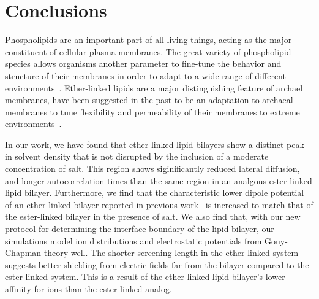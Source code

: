 \documentclass[12pt,openany,final]{book}
\begin{document}
\chapter{Conclusions}
Phospholipids are an important part of all living things, acting as the major constituent of cellular plasma membranes. 
The great variety of phospholipid species allows organisms another parameter
to fine-tune the behavior and structure of their membranes in order to adapt to a wide range of different
environments~\cite{van:2008:lipidvariety}.
Ether-linked lipids are a major distinguishing feature of archael membranes, have been suggested in the past to be an adaptation to archaeal membranes to tune
flexibility and permeability of their membranes to extreme environments~\cite{koga:2014,valentine:2007}.

In our work, we have found that ether-linked lipid bilayers show a distinct peak in solvent density
that is not disrupted by the inclusion of a moderate concentration of salt. This region
shows siginificantly reduced lateral diffusion, and longer autocorrelation times than the same
region in an analgous ester-linked lipid bilayer. Furthermore, we find that
the characteristic lower dipole potential of an ether-linked bilayer reported in previous work~\cite{kruczek:2017:ether} is 
increased to match that of the ester-linked bilayer in the presence of salt. We also find that,
with our new protocol for determining the interface boundary of the lipid bilayer,
our simulations model ion distributions and electrostatic potentials from Gouy-Chapman theory well. 
The shorter screening length in the
ether-linked system suggests better shielding from electric fields far 
from the bilayer compared to the ester-linked system. This is a result
of the ether-linked lipid bilayer's lower affinity for ions than the ester-linked analog.

\end{document}
